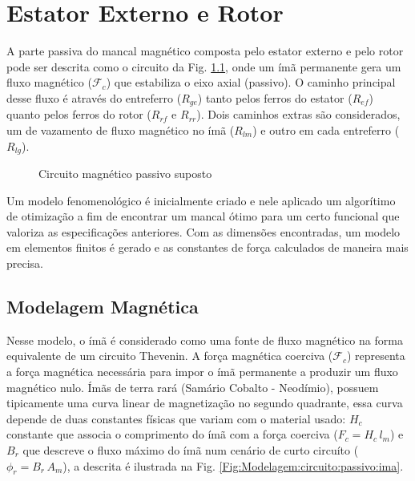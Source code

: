 \pagestyle{empty}
	\cleardoublepage
\pagestyle{fancy}


\chapter{Estator Externo e Rotor}

A parte passiva do mancal magnético composta pelo estator externo e pelo rotor  pode ser descrita como o circuito da Fig. \ref{Fig:Modelagem:circuito:passivo:umlado}, onde um ímã permanente gera um fluxo magnético ($\mathcal{F}_c$) que estabiliza o eixo axial (passivo). O caminho principal desse fluxo é através do entreferro ($R_{ge}$) tanto pelos ferros do estator ($R_{ef}$) quanto pelos ferros do rotor ($R_{rf}$ e $R_{rr}$). Dois caminhos extras são considerados, um de vazamento de fluxo magnético no ímã ($R_{lm}$) e outro em cada entreferro ($R_{lg}$). 

\begin{figure}[!ht]
	\centering
	\def\svgwidth{1\columnwidth}
	
	\caption{Circuito magnético passivo suposto}
	\label{Fig:Modelagem:circuito:passivo:umlado}
\end{figure}

Um modelo fenomenológico é inicialmente criado e nele aplicado um algorítimo de otimização a fim de encontrar um mancal ótimo para um certo funcional que valoriza as especificações anteriores. Com as dimensões encontradas, um modelo em elementos finitos é gerado e as constantes de força calculados de maneira mais precisa.

\section{Modelagem Magnética}

Nesse modelo, o ímã é considerado como uma fonte de fluxo magnético na forma equivalente de um circuito Thevenin. A força magnética coerciva ($\mathcal{F}_c$) representa a força magnética necessária para impor o ímã permanente a produzir um fluxo magnético nulo. Ímãs de terra rará (Samário Cobalto - Neodímio), possuem tipicamente uma curva linear de magnetização no segundo quadrante, essa curva depende de duas constantes físicas que variam com o material usado: $H_c$ constante que associa o comprimento do ímã com a força coerciva ($ F_c = H_c \, l_m$) e $B_r$ que descreve o fluxo máximo do ímã num cenário de curto circuíto ($\phi_r = B_r \, A_m$), a descrita é ilustrada na Fig. \ref{Fig:Modelagem:circuito:passivo:ima}.

